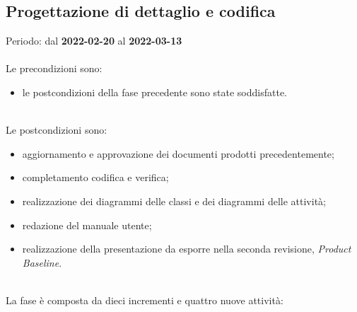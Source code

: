 \subsection{Progettazione di dettaglio e codifica}
Periodo: dal \textbf{2022-02-20} al \textbf{2022-03-13} \mbox{} \\ \mbox{} \\
Le precondizioni sono:
\begin{itemize}
	\item le postcondizioni della fase precedente sono state soddisfatte.
\end{itemize} \mbox{} \\
Le postcondizioni sono:
\begin{itemize}
	\item aggiornamento e approvazione dei documenti prodotti precedentemente;
	\item completamento codifica e verifica;
	\item realizzazione dei diagrammi delle classi e dei diagrammi delle attività;
	\item redazione del manuale utente;
	\item realizzazione della presentazione da esporre nella seconda revisione, \textit{Product Baseline}\glo{}. 
\end{itemize} \mbox{} \\
La fase è composta da dieci incrementi e quattro nuove attività:
